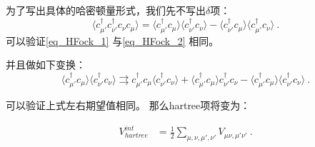 为了写出具体的哈密顿量形式，我们先不写出$\delta$项：
\begin{equation}\label{eq_HFock_2}
\langle c_{\mu'}^\dagger c_{\nu'}^\dagger c_{\nu}^~ c_{\mu}^~ \rangle = \langle c_{\mu'}^\dagger c_\mu^~\rangle\langle c_{\nu'}^\dagger c_\nu^~\rangle-\langle c_{\nu'}^\dagger c_\mu^~\rangle\langle c_{\mu'}^\dagger c_\nu^~\rangle~.
\end{equation}
可以验证\autoref{eq_HFock_1} 与\autoref{eq_HFock_2} 相同。

并且做如下变换：
$$\langle c_{\mu'}^\dagger c_\mu^~\rangle\langle c_{\nu'}^\dagger c_\nu^~\rangle\rightrightarrows c_{\mu'}^\dagger c_\mu^~\langle c_{\nu'}^\dagger c_\nu^~\rangle+\langle c_{\mu'}^\dagger c_\mu^~\rangle c_{\nu'}^\dagger c_\nu^~-\langle c_{\mu'}^\dagger c_\mu^~\rangle\langle c_{\nu'}^\dagger c_\nu^~\rangle ~.$$

可以验证上式左右期望值相同。
那么hartree项将变为：

\begin{equation}
\begin{aligned}
V^{int}_{hartree}&=\frac{1}{2}\sum\limits_{\mu,\nu,\mu',\nu'}V_{\mu\nu,\mu'\nu'}~.
\end{aligned}
\end{equation}
